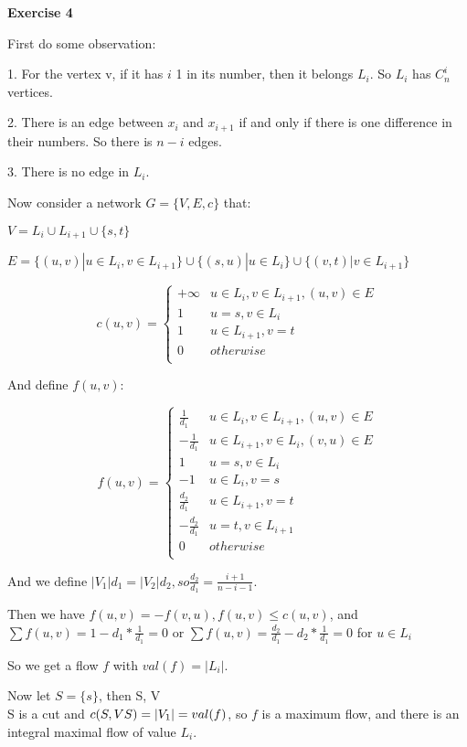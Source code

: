 \documentclass{article}
\begin{document}
\textbf{Exercise 4}

First do some observation:

1. For the vertex v, if it has $i$ 1 in its number, then it belongs $L_i$. So $L_i$ has $C_{n}^{i}$ vertices.

2. There is an edge between $x_i$ and $x_{i+1}$ if and only if there is one difference in their numbers. So there is $n-i$ edges.

3. There is no edge in $L_{i}$.

Now consider a network $G = \{ V, E, c \}$ that:

$V = L_{i} \cup L_{i+1} \cup \{s, t\}$

$E = \{  (u,v) | u \in L_{i}, v \in L_{i+1} \} \cup \{(s,u) | u \in L_{i} \} \cup \{(v,t) | v \in L_{i+1} \}$

$$c(u, v)=
\begin{cases}
+\infty & u\in L_{i}, v \in  L_{i+1}, (u,v) \in E\\
1& u=s, v \in  L_{i}\\
1& u \in  L_{i+1} , v=t   \\
0& otherwise\\
\end{cases}$$

And define $f(u,v)$:

$$f(u, v)=
\begin{cases}
\frac{1}{d_1} & u\in L_{i}, v \in L_{i+1}, (u,v) \in E\\
-\frac{1}{d_1} & u\in L_{i+1}, v \in L_{i}, (v,u) \in E\\
1 & u=s, v \in L_{i}\\
-1 & u\in L_{i}, v = s\\
\frac{d_2}{d_1} & u\in L_{i+1}, v = t\\
-\frac{d_2}{d_1} & u=t, v\in L_{i+1}\\
0 & otherwise\\
\end{cases}$$

And we define $|V_1|d_1 = |V_2|d_2, so \frac{d_2}{d_1} = \frac{i+1}{n-i-1}$.

Then we have $f(u,v) = - f(v,u), f(u,v) \leqslant c(u,v)$, and $\sum f(u,v) = 1- d_1 * \frac{1}{d_1} = 0$ or $\sum f(u,v) = \frac{d_2}{d_1} - d_2 *\frac{1}{d_1} = 0$ for $u\in L_{i}$

So we get a flow $f$ with $val(f) = |L_{i}|$.

Now let $S = \{ s\}$, then S, V\\S is a cut and $c(S,V\\S) = |V_1| = val(f)$, so $f$ is a maximum flow, and there is an integral maximal flow of value $L_{i}$. 
\end{document}
